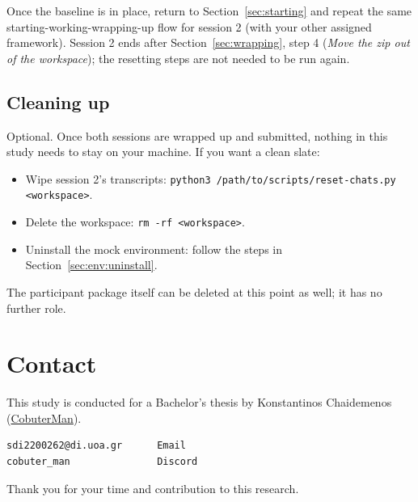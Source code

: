 \documentclass[11pt, a4paper]{article}
\begin{document}
Once the baseline is in place, return to Section~\ref{sec:starting} and repeat the same starting-working-wrapping-up flow for session 2 (with your other assigned framework). Session 2 ends after Section~\ref{sec:wrapping}, step 4 (\emph{Move the zip out of the workspace}); the resetting steps are not needed to be run again.

\subsection{Cleaning up}
\label{sec:teardown}

Optional. Once both sessions are wrapped up and submitted, nothing in this study needs to stay on your machine. If you want a clean slate:

\begin{itemize}
    \item Wipe session 2's transcripts: \texttt{python3 /path/to/scripts/reset-chats.py <workspace>}.
    \item Delete the workspace: \texttt{rm -rf <workspace>}.
    \item Uninstall the mock environment: follow the steps in Section~\ref{sec:env:uninstall}.
\end{itemize}

The participant package itself can be deleted at this point as well; it has no further role.

\section{Contact}
\label{sec:contact}

This study is conducted for a Bachelor's thesis by Konstantinos Chaidemenos (\href{https://github.com/sdi2200262}{CobuterMan}).

\begin{verbatim}
sdi2200262@di.uoa.gr      Email
cobuter_man               Discord
\end{verbatim}

\vspace{1cm}

Thank you for your time and contribution to this research.
\end{document}
